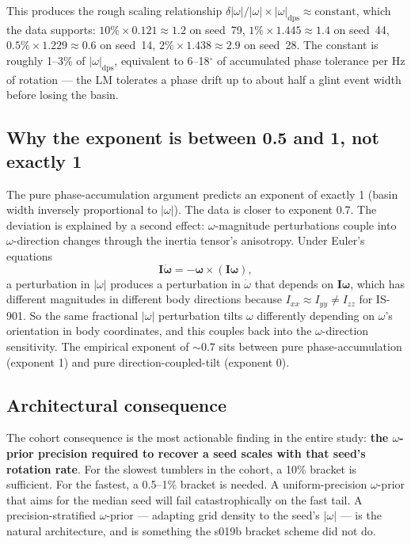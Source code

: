 \documentclass[11pt,a4paper]{article}
\begin{document}
This produces the rough scaling relationship $\delta|\omega|/|\omega| \times |\omega|_{\mathrm{dps}} \approx \mathrm{constant}$, which the data supports: $10\% \times 0.121 \approx 1.2$ on seed~79, $1\% \times 1.445 \approx 1.4$ on seed~44, $0.5\% \times 1.229 \approx 0.6$ on seed~14, $2\% \times 1.438 \approx 2.9$ on seed~28. The constant is roughly 1--3\% of $|\omega|_{\mathrm{dps}}$, equivalent to 6--18$^\circ$ of accumulated phase tolerance per Hz of rotation — the LM tolerates a phase drift up to about half a glint event width before losing the basin.

\subsection{Why the exponent is between 0.5 and 1, not exactly 1}

The pure phase-accumulation argument predicts an exponent of exactly 1 (basin width inversely proportional to $|\omega|$). The data is closer to exponent 0.7. The deviation is explained by a second effect: $\omega$-magnitude perturbations couple into $\omega$-direction changes through the inertia tensor's anisotropy. Under Euler's equations
\begin{equation}
\boldsymbol{I}\dot{\boldsymbol{\omega}} = -\boldsymbol{\omega} \times (\boldsymbol{I}\boldsymbol{\omega}),
\end{equation}
a perturbation in $|\omega|$ produces a perturbation in $\dot\omega$ that depends on $\boldsymbol{I}\boldsymbol{\omega}$, which has different magnitudes in different body directions because $I_{xx} \approx I_{yy} \neq I_{zz}$ for IS-901. So the same fractional $|\omega|$ perturbation tilts $\omega$ differently depending on $\omega$'s orientation in body coordinates, and this couples back into the $\omega$-direction sensitivity. The empirical exponent of $\sim 0.7$ sits between pure phase-accumulation (exponent 1) and pure direction-coupled-tilt (exponent 0).

\subsection{Architectural consequence}

The cohort consequence is the most actionable finding in the entire study: \textbf{the $\omega$-prior precision required to recover a seed scales with that seed's rotation rate}. For the slowest tumblers in the cohort, a 10\% bracket is sufficient. For the fastest, a 0.5--1\% bracket is needed. A uniform-precision $\omega$-prior that aims for the median seed will fail catastrophically on the fast tail. A precision-stratified $\omega$-prior --- adapting grid density to the seed's $|\omega|$ --- is the natural architecture, and is something the s019b bracket scheme did not do.
\end{document}
